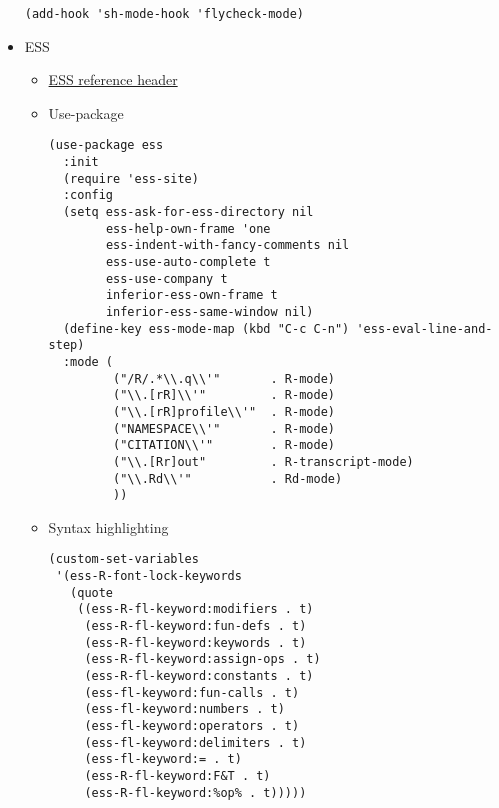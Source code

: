 \documentclass{article}
\begin{document}
\begin{itemize}
\begin{verbatim}
(add-hook 'sh-mode-hook 'flycheck-mode)
\end{verbatim}

\item ESS
\label{sec:org150f153}
\begin{itemize}
\item \href{basecamp.org}{ESS reference header}
\label{sec:orgd4c9c5b}
\item Use-package
\label{sec:orgda17497}
\begin{verbatim}
(use-package ess
  :init
  (require 'ess-site)
  :config
  (setq ess-ask-for-ess-directory nil
        ess-help-own-frame 'one
        ess-indent-with-fancy-comments nil
        ess-use-auto-complete t
        ess-use-company t
        inferior-ess-own-frame t
        inferior-ess-same-window nil)
  (define-key ess-mode-map (kbd "C-c C-n") 'ess-eval-line-and-step)
  :mode (
         ("/R/.*\\.q\\'"       . R-mode)
         ("\\.[rR]\\'"         . R-mode)
         ("\\.[rR]profile\\'"  . R-mode)
         ("NAMESPACE\\'"       . R-mode)
         ("CITATION\\'"        . R-mode)
         ("\\.[Rr]out"         . R-transcript-mode)
         ("\\.Rd\\'"           . Rd-mode)
         ))
\end{verbatim}
\item Syntax highlighting
\label{sec:orgeb3dce8}
\begin{verbatim}
(custom-set-variables
 '(ess-R-font-lock-keywords
   (quote
    ((ess-R-fl-keyword:modifiers . t)
     (ess-R-fl-keyword:fun-defs . t)
     (ess-R-fl-keyword:keywords . t)
     (ess-R-fl-keyword:assign-ops . t)
     (ess-R-fl-keyword:constants . t)
     (ess-fl-keyword:fun-calls . t)
     (ess-fl-keyword:numbers . t)
     (ess-fl-keyword:operators . t)
     (ess-fl-keyword:delimiters . t)
     (ess-fl-keyword:= . t)
     (ess-R-fl-keyword:F&T . t)
     (ess-R-fl-keyword:%op% . t)))))
\end{verbatim}
\end{itemize}


\end{itemize}
\end{document}
